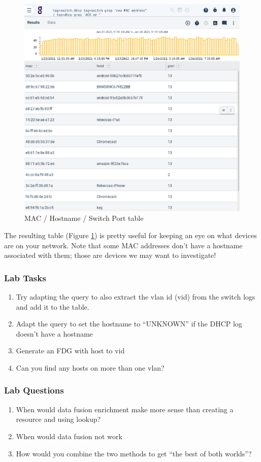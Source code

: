 \begin{figure}
	\includegraphics[width=0.6\linewidth]{images/mac-host-table.png}
	\caption{MAC / Hostname / Switch Port table}
	\label{fig:mac-host-table}
\end{figure}

The resulting table (Figure \ref{fig:mac-host-table}) is pretty useful for keeping an eye on what devices are on your network. Note that some MAC addresses don't have a hostname associated with them; those are devices we may want to investigate!

\subsubsection{Lab Tasks}

\begin{enumerate}
\item
  Try adapting the query to also extract the vlan id (vid) from the
  switch logs and add it to the table.
\item
  Adapt the query to set the hostname to ``UNKNOWN'' if the DHCP log
  doesn't have a hostname
\item
  Generate an FDG with host to vid
\item
  Can you find any hosts on more than one vlan?
\end{enumerate}


\subsubsection{Lab Questions}

\begin{enumerate}
\item
  {When would data fusion enrichment make more sense than creating a
  resource and using lookup?}
\item
  {When would data fusion not work}
\item
  {How would you combine the two methods to get ``the best of both
  worlds''?}
\end{enumerate}


